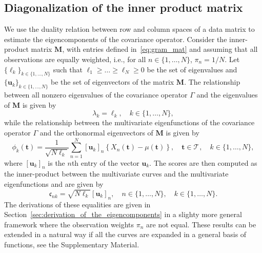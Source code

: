 \documentclass[times,sort&compress,3p]{elsarticle}
\theoremstyle{plain}%
\theoremstyle{definition}
\newcommand{\TT}[1]{\mathcal{T}_{#1}} %
\newcommand{\pointt}{\mathbf{t}} %
\begin{document}
\subsection{Diagonalization of the inner product matrix} %
\label{sub:by_diagonalization_of_the_inner_product_matrix}

We use the duality relation between row and column spaces of a data matrix to estimate the eigencomponents of the covariance operator. Consider the inner-product matrix $\mathbf{M}$, with entries defined in~\eqref{eq:gram_mat} and assuming that all observations are equally weighted, i.e., for all $n \in \{1, \dots, N\}$, $\pi_n = 1/N$.
Let $\{\ell_k\}_{k \in \{1, \dots, N\}}$ such that $\ell_1 \geq \dots \geq \ell_N \geq 0$ be the set of eigenvalues and $\{\boldsymbol{u}_k\}_{k \in \{1, \dots, N\}}$ be the set of eigenvectors of the matrix $\mathbf{M}$. The relationship between all nonzero eigenvalues of the covariance operator $\Gamma$ and the eigenvalues of $\mathbf{M}$ is given by
\begin{equation}\label{eq:eigenvalues_relation_p}
    \lambda_k = \ell_k, \quad k \in \{1, \dots, N\},
\end{equation}
while the relationship between the multivariate eigenfunctions of the covariance operator $\Gamma$ and the orthonormal eigenvectors of $\mathbf{M}$ is given by
\begin{equation}\label{eq:eigenfunction_relation_p}
    \phi_k(\pointt) = \frac{1}{\sqrt{N \ell_k}}\sum_{n = 1}^N [\boldsymbol{u}_{k}]_n\left\{X_n(\pointt) - \mu(\pointt)\right\}, \quad \pointt \in \TT{}, \quad k \in \{1, \dots, N\}, 
\end{equation}
where $[\boldsymbol{u}_{k}]_n$ is the $n$th entry of the vector $\boldsymbol{u}_k$. The scores are then computed as the inner-product between the multivariate curves and the multivariate eigenfunctions and are given by
\begin{equation}\label{eq:scores_relation_p}
    \mathfrak{c}_{nk} = \sqrt{N \ell_k}[\boldsymbol{u}_{k}]_n, \quad n \in \{1, \dots, N\}, \quad k \in \{1, \dots, N\}. 
\end{equation}
The derivations of these equalities are given in Section~\ref{sec:derivation_of_the_eigencomponents} in a slighty more general framework where the observation weights $\pi_n$ are not equal. These results can be extended in a natural way if all the curves are expanded in a general basis of functions, see the Supplementary Material.

\end{document}
